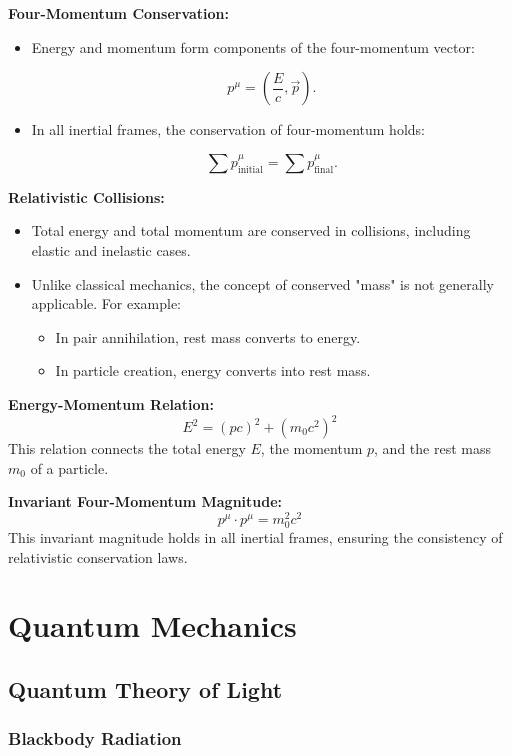 \documentclass{article}
\newcommand{\eqbox}[1]{\begin{tcolorbox}[colback=gray!10] #1 \end{tcolorbox}}
\newcommand{\conceptbox}[1]{\begin{tcolorbox}[colback=blue!10] #1 \end{tcolorbox}}
\begin{document}
\conceptbox{
    \textbf{Four-Momentum Conservation:}
    \begin{itemize}
        \item Energy and momentum form components of the four-momentum vector:
        \eqbox{
        \[
        p^\mu = \left( \frac{E}{c}, \vec{p} \right).
        \]
        }
        \item In all inertial frames, the conservation of four-momentum holds:
        \eqbox{
        \[
        \sum p^\mu_{\text{initial}} = \sum p^\mu_{\text{final}}.
        \]
    }
    \end{itemize}
}

\conceptbox{
    \textbf{Relativistic Collisions:}
    \begin{itemize}
        \item Total energy and total momentum are conserved in collisions, including elastic and inelastic cases.
        \item Unlike classical mechanics, the concept of conserved "mass" is not generally applicable. For example:
        \begin{itemize}
            \item In pair annihilation, rest mass converts to energy.
            \item In particle creation, energy converts into rest mass.
        \end{itemize}
    \end{itemize}
}

\eqbox{
\textbf{Energy-Momentum Relation:}
\[
E^2 = (pc)^2 + (m_0c^2)^2
\]
This relation connects the total energy \( E \), the momentum \( p \), and the rest mass \( m_0 \) of a particle.
}

\eqbox{
\textbf{Invariant Four-Momentum Magnitude:}
\[
p^\mu \cdot p^\mu = m_0^2 c^2
\]
This invariant magnitude holds in all inertial frames, ensuring the consistency of relativistic conservation laws.
}
\newpage
\section{Quantum Mechanics}

\subsection{Quantum Theory of Light}

\subsubsection{Blackbody Radiation}
\end{document}
